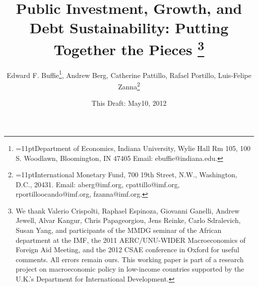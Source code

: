 \documentclass[11pt]{article}
\begin{document}
\author{Edward F. Buffie\thanks{\baselineskip=11ptDepartment of Economics,
Indiana University, Wylie Hall Rm 105, 100 S. Woodlawn, Bloomington, IN
47405 Email: ebuffie@indiana.edu.}, Andrew Berg, Catherine Pattillo, Rafael
Portillo, Luis-Felipe Zanna\thanks{\baselineskip=11ptInternational Monetary
Fund, 700 19th Street, N.W., Washington, D.C., 20431. Email: aberg@imf.org,
cpattillo@imf.org, rportilloocando@imf.org, fzanna@imf.org.}}
\title{{\Large \textbf{Public Investment, Growth, and Debt Sustainability:
Putting Together the Pieces }}\thanks{\baselineskip=11pt We thank Valerio
Crispolti, Raphael Espinoza, Giovanni Ganelli, Andrew Jewell, Alvar Kangur,
Chris Papageorgiou, Jens Reinke, Carlo Sdralevich, Susan Yang, and
participants of the MMDG seminar of the African department at the IMF, the
2011 AERC/UNU-WIDER Macroeconomics of Foreign Aid Meeting, and the 2012 CSAE
conference in Oxford for useful comments. All errors remain ours. This
working paper is part of a research project on macroeconomic policy in
low-income countries supported by the U.K.'s Department for International
Development. }}
\date{This Draft: May10, 2012 }
\maketitle
\end{document}
